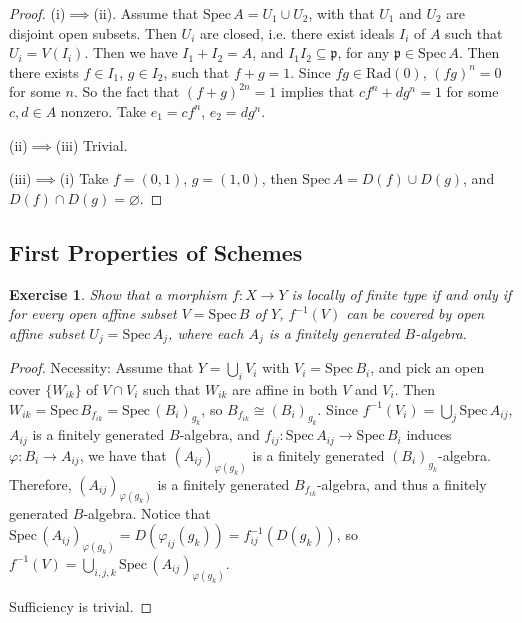 \documentclass[12pt]{amsart}
\newtheorem{exe}{Exercise}[subsection]
\begin{document}
\begin{proof}
(i)$\implies$(ii). Assume that $\mathrm{Spec}\,A=U_1\cup U_2$, with that $U_1$ and $U_2$ are disjoint open subsets. Then $U_i$ are closed, i.e. there exist ideals $I_i$ of $A$ such that $U_i=V(I_i)$.
Then we have $I_1+I_2=A$, and $I_1I_2\subseteq \mathfrak{p}$,  for any $\mathfrak{p}\in \mathrm{Spec}\,A$. Then there exists $f\in I_1$, $g\in I_2$, such that $f+g=1$. Since $fg\in \mathrm{Rad}(0)$,
$(fg)^n=0$ for some $n$. So the fact that $(f+g)^{2n}=1$ implies that $cf^n+dg^n=1$ for some $c,d\in A$ nonzero. Take $e_1=cf^n$, $e_2=dg^n$.

(ii)$\implies$(iii) Trivial.

(iii)$\implies$(i) Take $f=(0,1)$, $g=(1,0)$, then $\mathrm{Spec}\,A= D(f)\cup D(g)$, and $D(f)\cap D(g)=\varnothing$.
\end{proof}

\subsection{First Properties of Schemes}

\begin{exe}
	\label{2.3.1}
Show that a morphism $f: X\rightarrow Y $ is locally of finite type if and only if for every open affine
subset $V=\mathrm{Spec}\,B$ of $Y$, $f^{-1}(V)$ can be covered by open affine subset $U_j=\mathrm{Spec}\,A_j$, where each $A_j$ is a
finitely generated $B$-algebra.
\end{exe}

\begin{proof}
Necessity: Assume that $Y=\bigcup_i V_i$ with $V_i= \mathrm{Spec}\,B_i$, and pick an open cover $\{W_{ik}\}$ of $ V\cap V_i$ such that $W_{ik}$ are affine in both $V$ and $V_i$. Then $W_{ik}=\mathrm{Spec}\,B_{f_{ik}}=\mathrm{Spec}\,(B_{i})_{g_k}$, so $B_{f_{ik}}\cong (B_{i})_{g_k}$. Since $f^{-1}(V_i)=\bigcup_j \mathrm{Spec}\,A_{ij}$, $A_{ij}$ is a finitely generated $B$-algebra, and
$f_{ij}:\mathrm{Spec}\,A_{ij}\rightarrow \mathrm{Spec}\,B_i$ induces $\varphi : B_i\rightarrow A_{ij} $, we have that $(A_{ij})_{\varphi(g_k)}$ is
a finitely generated $(B_{i})_{g_k}$-algebra. Therefore, $(A_{ij})_{\varphi(g_k)}$ is a finitely generated $B_{f_{ik}}$-algebra, and thus a finitely generated $B$-algebra. Notice that $\mathrm{Spec}\,(A_{ij})_{\varphi(g_k)}=D(\varphi _{ij}(g_k))=f_{ij}^{-1}(D(g_k))$, so 
$f^{-1}(V)=\bigcup_{i,j,k} \mathrm{Spec}\,(A_{ij})_{\varphi(g_k)}$.

 Sufficiency is trivial.
\end{proof}
\end{document}
